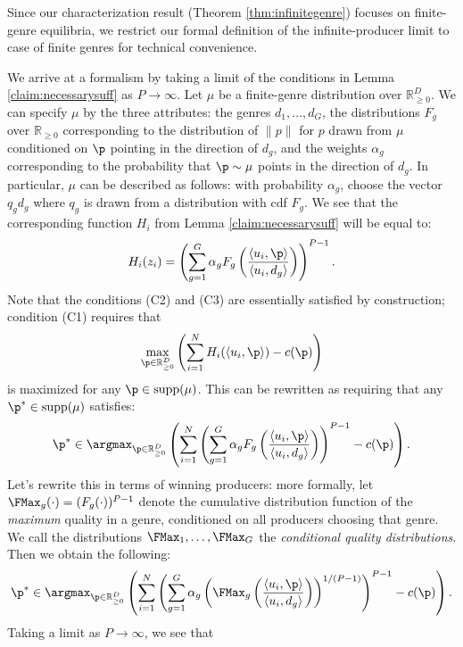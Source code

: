 \documentclass[10pt]{article}
\begin{document}
\begin{ReviewVerbatim}
Since our characterization result (Theorem \ref{thm:infinitegenre}) focuses on finite-genre equilibria,  we restrict our formal definition of the infinite-producer limit to case of finite genres for technical convenience.

We arrive at a formalism by taking a limit of the conditions  in Lemma \ref{claim:necessarysuff} as $P \rightarrow \infty$. Let $\mu$ be a finite-genre distribution over $\mathbb{R}_{\ge 0}^D$. We can specify $\mu$ by the three attributes: the genres $d_1, \ldots, d_G$, the distributions $F_g$ over $\mathbb{R}_{\ge 0}$ corresponding to the distribution of $\|p\|$ for $p$ drawn from $\mu$ conditioned on $\p$ pointing in the direction of $d_g$, and the weights $\alpha_g$ corresponding to the probability that $\p \sim \mu$ points in the direction of $d_g$. In particular, $\mu$ can be described as follows: with probability $\alpha_g$, choose the vector $q_g d_g$ where $q_g$ is drawn from a distribution with cdf $F_g$. We see that the corresponding function $H_i$ from Lemma \ref{claim:necessarysuff} will be equal to:
\[H_i(z_i) = \left(\sum_{g=1}^G \alpha_g F_g\left(\frac{\langle u_i, \p \rangle}{\langle u_i, d_g \rangle} \right) \right)^{P-1}. \]
Note that the conditions (C2) and (C3) are essentially satisfied by construction; condition (C1) requires that
\[\max_{\p \in \mathbb{R}_{\ge 0}^D} \left(\sum_{i=1}^N H_i(\langle u_i, \p\rangle) - c(\p) \right)\] is maximized for any $\p \in \text{supp}(\mu)$. This can be rewritten as requiring that any $\p^* \in \text{supp}(\mu)$ satisfies:
\[
  \p^* \in \argmax_{\p \in \mathbb{R}_{\ge 0}^D} \left(\sum_{i=1}^N \left(\sum_{g=1}^G \alpha_g F_g\left(\frac{\langle u_i, \p \rangle}{\langle u_i, d_g \rangle} \right) \right)^{P-1} - c(\p) \right).\]
Let's rewrite this in terms of winning producers: more formally, let $\FMax_g(\cdot) = (F_g(\cdot))^{P-1}$ denote the cumulative distribution function of the \textit{maximum} quality in a genre, conditioned on all producers choosing that genre. We call the distributions $\FMax_1, \ldots, \FMax_G$ the \textit{conditional quality distributions}. Then we obtain the following:
\begin{equation}
\label{eq:finitegenrep}
  \p^* \in \argmax_{\p \in \mathbb{R}_{\ge 0}^D} \left(\sum_{i=1}^N \left(\sum_{g=1}^G \alpha_g \left(\FMax_g\left(\frac{\langle u_i, \p \rangle}{\langle u_i, d_g \rangle} \right)\right)^{1/(P-1)} \right)^{P-1} - c(\p) \right).
\end{equation}
Taking a limit as $P \rightarrow \infty$, we see that

\end{ReviewVerbatim}
\end{document}

